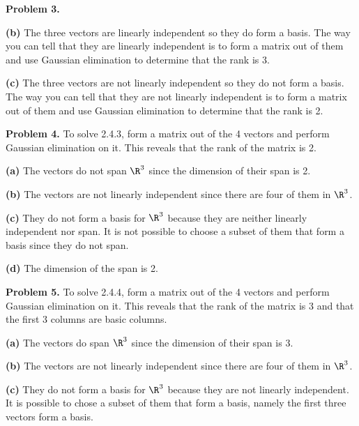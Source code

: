 \documentclass[oneside,12pt]{amsart}
\begin{document}

\bigskip

\textbf{Problem 3.}

\textbf{(b)} The three vectors are linearly independent so they do form a basis.
The way you can tell that they are linearly independent is to form a matrix
out of them and use Gaussian elimination to determine that the rank is 3.

\bigskip

\textbf{(c)} The three vectors are not linearly independent so they do not form
a basis. The way you can tell that they are not linearly independent is to
form a matrix out of them and use Gaussian elimination to determine that the rank is 2.


\bigskip

\textbf{Problem 4.} To solve 2.4.3, form a matrix out of the 4 vectors and
perform Gaussian elimination on it. This reveals that the rank of the matrix
is 2.

\bigskip

\textbf{(a)} The vectors do not span $\R^3$ since the dimension of their span is 2.

\textbf{(b)} The vectors are not linearly independent since  there are four of them in $\R^3$.

\textbf{(c)} They do not form a basis for $\R^3$ because they are neither linearly independent
nor span. It is not possible to choose a subset of them that form a basis since they do
not span.

\textbf{(d)} The dimension of the span is 2.


\bigskip

\textbf{Problem 5.} To solve 2.4.4, form a matrix out of the 4 vectors and
perform Gaussian elimination on it. This reveals that the rank of the matrix
is 3 and that the first 3 columns are basic columns.

\bigskip

\textbf{(a)} The vectors do  span $\R^3$ since the dimension of their span is 3.

\textbf{(b)} The vectors are not linearly independent since  there are four of them in $\R^3$.

\textbf{(c)} They do not form a basis for $\R^3$ because they are not linearly independent.
It is possible to chose a subset of them that form a basis, namely the first three vectors
form a basis.
\end{document}
